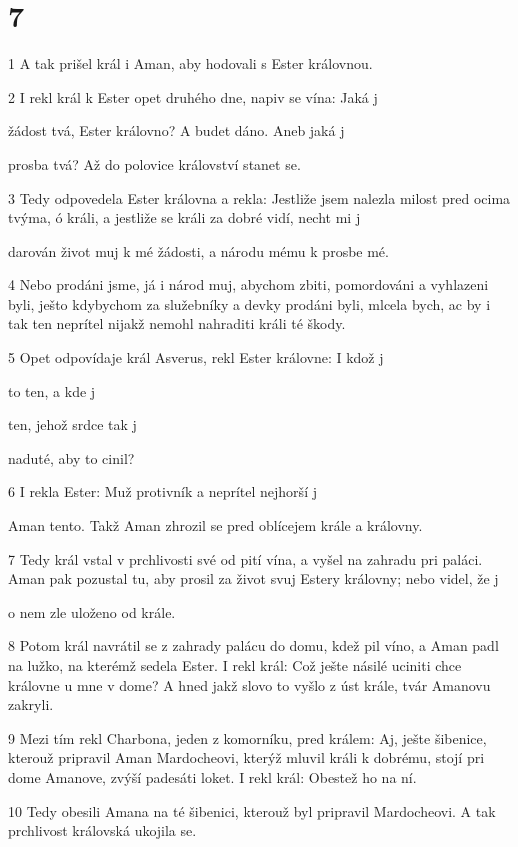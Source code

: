 \chapter{7}

\par 1 A tak prišel král i Aman, aby hodovali s Ester královnou.
\par 2 I rekl král k Ester opet druhého dne, napiv se vína: Jaká j\par žádost tvá, Ester královno? A budet dáno. Aneb jaká j\par prosba tvá? Až do polovice království stanet se.
\par 3 Tedy odpovedela Ester královna a rekla: Jestliže jsem nalezla milost pred ocima tvýma, ó králi, a jestliže se králi za dobré vidí, necht mi j\par darován život muj k mé žádosti, a národu mému k prosbe mé.
\par 4 Nebo prodáni jsme, já i národ muj, abychom zbiti, pomordováni a vyhlazeni byli, ješto kdybychom za služebníky a devky prodáni byli, mlcela bych, ac by i tak ten neprítel nijakž nemohl nahraditi králi té škody.
\par 5 Opet odpovídaje král Asverus, rekl Ester královne: I kdož j\par to ten, a kde j\par ten, jehož srdce tak j\par naduté, aby to cinil?
\par 6 I rekla Ester: Muž protivník a neprítel nejhorší j\par Aman tento. Takž Aman zhrozil se pred oblícejem krále a královny.
\par 7 Tedy král vstal v prchlivosti své od pití vína, a vyšel na zahradu pri paláci. Aman pak pozustal tu, aby prosil za život svuj Estery královny; nebo videl, že j\par o nem zle uloženo od krále.
\par 8 Potom král navrátil se z zahrady palácu do domu, kdež pil víno, a Aman padl na lužko, na kterémž sedela Ester. I rekl král: Což ješte násilé uciniti chce královne u mne v dome? A hned jakž slovo to vyšlo z úst krále, tvár Amanovu zakryli.
\par 9 Mezi tím rekl Charbona, jeden z komorníku, pred králem: Aj, ješte šibenice, kterouž pripravil Aman Mardocheovi, kterýž mluvil králi k dobrému, stojí pri dome Amanove, zvýší padesáti loket. I rekl král: Obestež ho na ní.
\par 10 Tedy obesili Amana na té šibenici, kterouž byl pripravil Mardocheovi. A tak prchlivost královská ukojila se.

